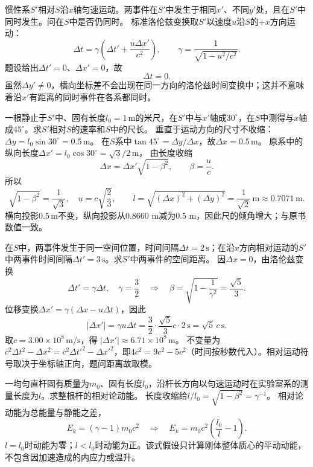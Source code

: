 \problemtext 惯性系$S'$相对$S$沿$x$轴匀速运动。两事件在$S'$中发生于相同$x'$、不同$y'$处，且在$S'$中同时发生。问在$S$中是否仍同时。
\workings
标准洛伦兹变换取$S'$以速度$u$沿$S$的$+x$方向运动：
\[
\Delta t=\gamma\left(\Delta t'+\frac{u\Delta x'}{c^2}\right),
\qquad
\gamma=\frac1{\sqrt{1-u^2/c^2}}.
\]
题设给出$\Delta t'=0$、$\Delta x'=0$，故
\[
\boxed{\Delta t=0}.
\]
\crosscheck 虽然$\Delta y'\ne0$，横向坐标差不会出现在同一方向的洛伦兹时间变换中；这并不意味着沿$x'$有距离的同时事件在各系都同时。

\problemtext 一根静止于$S'$中、固有长度$l_0=1\,\mathrm m$的米尺，在$S'$中与$x'$轴成$30^\circ$，在$S$中测得与$x$轴成$45^\circ$。求$S'$相对$S$的速率和$S$中的尺长。
\workings
垂直于运动方向的尺寸不收缩：
$\Delta y=l_0\sin30^\circ=0.5\,\mathrm m$。
在$S$系中$\tan45^\circ=\Delta y/\Delta x$，故$\Delta x=0.5\,\mathrm m$。
原系中的纵向长度$\Delta x'=l_0\cos30^\circ=\sqrt3/2\,\mathrm m$，
由长度收缩
\[
\Delta x=\Delta x'\sqrt{1-\beta^2},\qquad \beta=\frac uc.
\]
所以
\[
\sqrt{1-\beta^2}=\frac{1}{\sqrt3},
\quad
\boxed{u=c\sqrt{\frac23}},
\qquad
\boxed{l=\sqrt{(\Delta x)^2+(\Delta y)^2}
=\frac1{\sqrt2}\,\mathrm m\approx0.7071\,\mathrm m}.
\]
\crosscheck 横向投影$0.5\,\mathrm m$不变，纵向投影从$0.8660$ m减为$0.5$ m，因此尺的倾角增大；与原书数值一致。

\problemtext 在$S$中，两事件发生于同一空间位置，时间间隔$\Delta t=2\,\mathrm s$；在沿$x$方向相对运动的$S'$中两事件时间间隔$\Delta t'=3\,\mathrm s$。求$S'$中两事件的空间距离。
\workings
因$\Delta x=0$，由洛伦兹变换
\[
\Delta t'=\gamma\Delta t,\quad
\gamma=\frac{3}{2}
\quad\Longrightarrow\quad
\beta=\sqrt{1-\frac1{\gamma^2}}=\frac{\sqrt5}{3}.
\]
位移变换$\Delta x'=\gamma(\Delta x-u\Delta t)$，因此
\[
\boxed{|\Delta x'|
=\gamma u\Delta t
=\frac32\cdot\frac{\sqrt5}{3}c\cdot2\,\mathrm s
=\sqrt5\,c\,\mathrm s}.
\]
取$c=3.00\times10^8\,\mathrm{m/s}$，得
$\boxed{|\Delta x'|\approx6.71\times10^8\,\mathrm m}$。
\crosscheck 不变量为
$c^2\Delta t^2-\Delta x^2
=c^2\Delta t'^2-\Delta x'^2$，即$4c^2=9c^2-5c^2$（时间按秒数代入）。相对运动符号取决于坐标轴正向，题问距离故取模。

\problemtext 一均匀直杆固有质量为$m_0$、固有长度$l_0$，沿杆长方向以匀速运动时在实验室系的测量长度为$l$。求整根杆的相对论动能。
\workings
长度收缩给$l/l_0=\sqrt{1-\beta^2}=\gamma^{-1}$。
相对论动能为总能量与静能之差，
\[
E_k=(\gamma-1)m_0c^2
\quad\Longrightarrow\quad
\boxed{E_k=m_0c^2\left(\frac{l_0}{l}-1\right)}.
\]
\crosscheck $l=l_0$时动能为零；$l<l_0$时动能为正。该式假设只计算刚体整体质心的平动动能，不包含因加速造成的内应力或温升。

